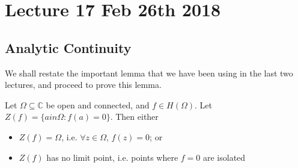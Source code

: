 \documentclass[11pt, oneside]{book}
\begin{document}

\chapter{Lecture 17 Feb 26th 2018}
	\label{chapter:lecture_17_feb_26th_2018}

\section{Analytic Continuity} %
\label{sec:analytic_continuity}

We shall restate the important lemma that we have been using in the last two lectures, and proceed to prove this lemma.

\begin{lemma*}\label{lemma*:principle_of_analytic_continuity}
	Let $\Omega \subseteq \mathbb{C}$ be open and connected, and $f \in H(\Omega)$. Let $Z(f) = \{a in \Omega : f(a) = 0 \}$. Then either
	\begin{itemize}
		\item $Z(f) = \Omega$, i.e. $\forall z \in \Omega, \, f(z) = 0$; or
		\item $Z(f)$ has no limit point, i.e. points where $f = 0$ are isolated
	\end{itemize}
\end{lemma*}
\end{document}
